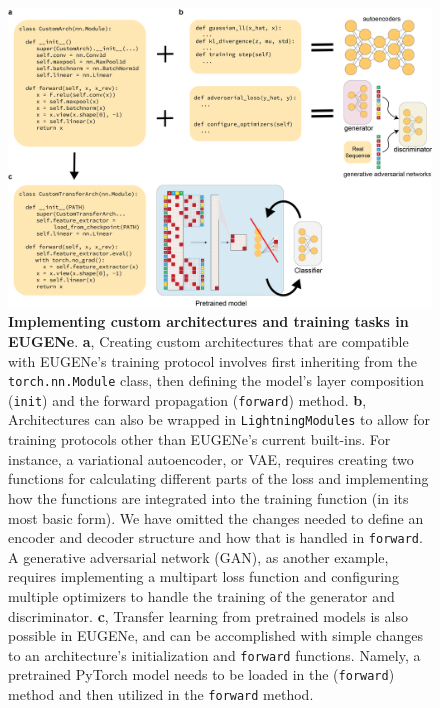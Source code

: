 \begin{figure}[p]
    \centering
    \includegraphics[width=\textwidth]{1_figures-and-files/suppfigure5.png}
    \caption[Custom model development in EUGENe]{\textbf{Implementing custom architectures and training tasks in EUGENe}. \textbf{a}, Creating custom architectures that are compatible with EUGENe’s training protocol involves first inheriting from the \texttt{torch.nn.Module} class, then defining the model’s layer composition (\texttt{init}) and the forward propagation (\texttt{forward}) method. \textbf{b}, Architectures can also be wrapped in \texttt{LightningModules} to allow for training protocols other than EUGENe’s current built-ins. For instance, a variational autoencoder, or VAE, requires creating two functions for calculating different parts of the loss and implementing how the functions are integrated into the training function (in its most basic form). We have omitted the changes needed to define an encoder and decoder structure and how that is handled in \texttt{forward}. A generative adversarial network (GAN), as another example, requires implementing a multipart loss function and configuring multiple optimizers to handle the training of the generator and discriminator. \textbf{c}, Transfer learning from pretrained models is also possible in EUGENe, and can be accomplished with simple changes to an architecture’s initialization and \texttt{forward} functions. Namely, a pretrained PyTorch model needs to be loaded in the (\texttt{forward}) method and then utilized in the \texttt{forward} method.}
    \label{fig:1 supplementary_5}
\end{figure}
